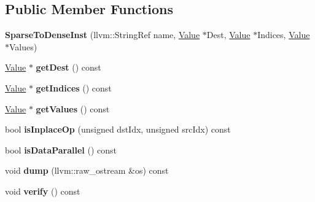 \subsection*{Public Member Functions}
\begin{DoxyCompactItemize}
\item 
\mbox{\label{classglow_1_1_sparse_to_dense_inst_a08b3d7887d974456c2a22fbdb49e8cfe}} 
{\bfseries Sparse\+To\+Dense\+Inst} (llvm\+::\+String\+Ref name, \hyperlink{classglow_1_1_value}{Value} $\ast$Dest, \hyperlink{classglow_1_1_value}{Value} $\ast$Indices, \hyperlink{classglow_1_1_value}{Value} $\ast$Values)
\item 
\mbox{\label{classglow_1_1_sparse_to_dense_inst_a9f4744ff52dd6da437c4c8762b30f46e}} 
\hyperlink{classglow_1_1_value}{Value} $\ast$ {\bfseries get\+Dest} () const
\item 
\mbox{\label{classglow_1_1_sparse_to_dense_inst_aae9d1921a12d61eab6acd1e18b207398}} 
\hyperlink{classglow_1_1_value}{Value} $\ast$ {\bfseries get\+Indices} () const
\item 
\mbox{\label{classglow_1_1_sparse_to_dense_inst_a302ad86ab6dd12932cb86b0342c60115}} 
\hyperlink{classglow_1_1_value}{Value} $\ast$ {\bfseries get\+Values} () const
\item 
\mbox{\label{classglow_1_1_sparse_to_dense_inst_a8d61e02c21eb8daf8b51ead7f81e4928}} 
bool {\bfseries is\+Inplace\+Op} (unsigned dst\+Idx, unsigned src\+Idx) const
\item 
\mbox{\label{classglow_1_1_sparse_to_dense_inst_a552521be62308aed7ea8fc6e2493fb60}} 
bool {\bfseries is\+Data\+Parallel} () const
\item 
\mbox{\label{classglow_1_1_sparse_to_dense_inst_a03b0782a648a5f9c2eb0bba7def54849}} 
void {\bfseries dump} (llvm\+::raw\+\_\+ostream \&os) const
\item 
\mbox{\label{classglow_1_1_sparse_to_dense_inst_af7396178dfa4a8b7c95b3b7213ba4dc7}} 
void {\bfseries verify} () const
\end{DoxyCompactItemize}
